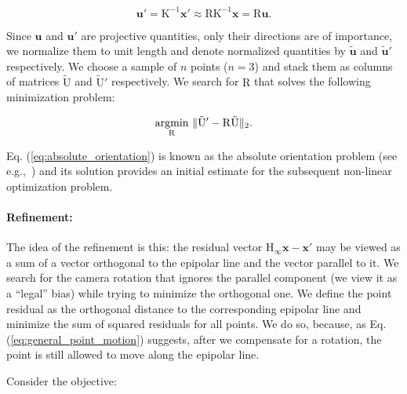 \begin{equation}
  \mathbf{u'} = \mathrm{K^{-1}}\mathbf{x}' \approx \mathrm{RK^{-1}}\mathbf{x} = \mathrm{R}\mathbf{u}.
\end{equation}

Since $\mathbf{u}$ and $\mathbf{u}'$ are projective quantities, only
their directions are of importance, we normalize them to unit length
and denote normalized quantities by $\mathbf{\tilde{u}}$ and
$\mathbf{\tilde{u}}'$ respectively. We choose a sample of $n$ points
($n=3$) and stack them as columns of matrices $\mathrm{\tilde{U}}$ and
$\mathrm{\tilde{U}'}$ respectively.  We search for $\mathrm{R}$ that
solves the following minimization problem:

\begin{equation}\label{eq:absolute_orientation}
\underset{\mathrm{R}}{\text{argmin}}\ \norm{\mathrm{\tilde{U}'-R\tilde{U}}}_2.
\end{equation}

Eq. (\ref{eq:absolute_orientation}) is known as the absolute
orientation problem (see e.g.,~\cite{Horn1987}) and its solution
provides an initial estimate for the subsequent non-linear
optimization problem.

\paragraph{Refinement:} The idea of the refinement is this: the
residual vector $\mathrm{H}_\infty\mathbf{x} - \mathbf{x}'$ may be
viewed as a sum of a vector orthogonal to the epipolar line and the
vector parallel to it.  We search for the camera rotation that ignores
the parallel component (we view it as a ``legal'' bias) while trying
to minimize the orthogonal one.  We define the point residual as the
orthogonal distance to the corresponding epipolar line and minimize
the sum of squared residuals for all points.  We do so, because, as
Eq. (\ref{eq:general_point_motion}) suggests, after we compensate for
a rotation, the point is still allowed to move along the epipolar
line.

Consider the objective:

